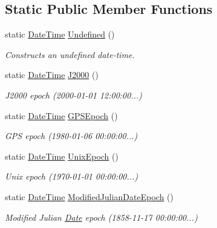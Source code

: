 \subsection*{Static Public Member Functions}
\begin{DoxyCompactItemize}
\item 
static \hyperlink{classlibrary_1_1physics_1_1time_1_1_date_time}{Date\+Time} \hyperlink{classlibrary_1_1physics_1_1time_1_1_date_time_a0e3772033a2cdd3a0c4dca7aac7a53ae}{Undefined} ()
\begin{DoxyCompactList}\small\item\em Constructs an undefined date-\/time. \end{DoxyCompactList}\item 
static \hyperlink{classlibrary_1_1physics_1_1time_1_1_date_time}{Date\+Time} \hyperlink{classlibrary_1_1physics_1_1time_1_1_date_time_a90b9490e08878d84d703fa9ae11cded7}{J2000} ()
\begin{DoxyCompactList}\small\item\em J2000 epoch (2000-\/01-\/01 12\+:00\+:00...) \end{DoxyCompactList}\item 
static \hyperlink{classlibrary_1_1physics_1_1time_1_1_date_time}{Date\+Time} \hyperlink{classlibrary_1_1physics_1_1time_1_1_date_time_a24eadd0df51d4426f4be5618db93a8af}{G\+P\+S\+Epoch} ()
\begin{DoxyCompactList}\small\item\em G\+PS epoch (1980-\/01-\/06 00\+:00\+:00...) \end{DoxyCompactList}\item 
static \hyperlink{classlibrary_1_1physics_1_1time_1_1_date_time}{Date\+Time} \hyperlink{classlibrary_1_1physics_1_1time_1_1_date_time_afc52d4f5c9c6e6e13e4c16e0f15018f6}{Unix\+Epoch} ()
\begin{DoxyCompactList}\small\item\em Unix epoch (1970-\/01-\/01 00\+:00\+:00...) \end{DoxyCompactList}\item 
static \hyperlink{classlibrary_1_1physics_1_1time_1_1_date_time}{Date\+Time} \hyperlink{classlibrary_1_1physics_1_1time_1_1_date_time_a7aecc9cd84e3d197165b1486c0b63c64}{Modified\+Julian\+Date\+Epoch} ()
\begin{DoxyCompactList}\small\item\em Modified Julian \hyperlink{classlibrary_1_1physics_1_1time_1_1_date}{Date} epoch (1858-\/11-\/17 00\+:00\+:00...) \end{DoxyCompactList}\item 

\end{DoxyCompactItemize}
